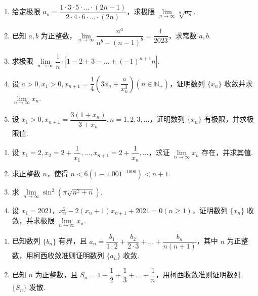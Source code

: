 \begin{enumerate}[label=\textbf{\arabic*.}, itemsep=4.2cm, resume]

    \item 给定极限 $a_n = \dfrac{1 \cdot 3 \cdot 5 \cdot \dots \cdot (2n-1)}{2 \cdot 4 \cdot 6 \cdot \dots \cdot (2n)}$，求极限 $\lim\limits_{n \to \infty} \sqrt[n]{a_n}$.

    \item 已知 $a, b$ 为正整数，$\lim\limits_{n \to \infty} \dfrac{n^a}{n^b - (n-1)^b} = \dfrac{1}{2023}$，求常数 $a, b$.

    \item 求极限 $\lim\limits_{n \to \infty} \dfrac{1}{n} \cdot \left| 1 - 2 + 3 - \dots + (-1)^{n+1}n \right|$.

    \item 设 $a > 0, x_1 > 0, x_{n+1} = \dfrac{1}{4} \left( 3x_n + \dfrac{a}{x_n^3} \right) (n \in \mathbb{N}_+)$，证明数列 $\{x_n\}$ 收敛并求 $\lim\limits_{n \to \infty} x_n$.

    \item 设 $x_1 > 0, x_{n+1} = \dfrac{3(1+x_n)}{3+x_n}, n=1,2,3,\dots$，证明数列 $\{x_n\}$ 有极限，并求极限值.
\end{enumerate}

\newpage

\begin{enumerate}[label=\textbf{\arabic*.}, itemsep=4.5cm, resume]
    \item 设 $x_1 = 2, x_2 = 2 + \dfrac{1}{x_1}, \dots, x_{n+1} = 2 + \dfrac{1}{x_n}, \dots$，求证 $\lim\limits_{n \to \infty} x_n$ 存在，并求其值.

    \item 求正整数 $n$，使得 $n < 6(1 - 1.001^{-1000}) < n+1$.

    \item 求 $\lim\limits_{n \to \infty} \sin^2 \left( \pi \sqrt{n^2 + n} \right)$.

    \item 设 $x_1 = 2021$，$x_n^2 - 2(x_n+1)x_{n+1} + 2021 = 0 (n \ge 1)$，证明数列 $\{x_n\}$ 收敛，并求极限 $\lim\limits_{n \to \infty} x_n$.

\end{enumerate}

\newpage

\begin{enumerate}[label=\textbf{\arabic*.}, itemsep=10cm, resume]
    \item 已知数列 $\{b_n\}$ 有界，且 $a_n = \dfrac{b_1}{1 \cdot 2} + \dfrac{b_2}{2 \cdot 3} + \dots + \dfrac{b_n}{n(n+1)}$，其中 $n$ 为正整数，用柯西收敛准则证明数列 $\{a_n\}$ 收敛.

    \item 已知 $n$ 为正整数，且 $S_n = 1 + \dfrac{1}{2} + \dfrac{1}{3} + \dots + \dfrac{1}{n}$，用柯西收敛准则证明数列 $\{S_n\}$ 发散.
\end{enumerate}

